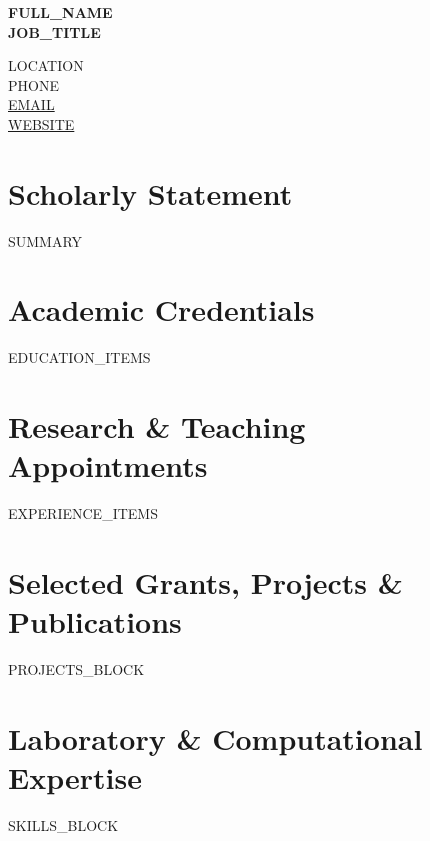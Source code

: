 \documentclass[10pt,letterpaper]{article}
\begin{document}
\begin{minipage}[t]{0.65\textwidth}
  {\LARGE \textbf{{{FULL_NAME}}}} \\[2pt]
  {\small \textbf{{{JOB_TITLE}}}}
\end{minipage}
\hfill
\begin{minipage}[t]{0.33\textwidth}
  \raggedleft \small
  {{LOCATION}} \\
  {{PHONE}} \\
  \href{mailto:{{EMAIL}}}{{{EMAIL}}} \\
  \href{https://{{WEBSITE}}}{{{WEBSITE}}}
\end{minipage}

\vspace{6pt}

\section{Scholarly Statement}
{{SUMMARY}}

\section{Academic Credentials}
{{EDUCATION_ITEMS}}

\section{Research \& Teaching Appointments}
{{EXPERIENCE_ITEMS}}

\section{Selected Grants, Projects \& Publications}
{{PROJECTS_BLOCK}}

\section{Laboratory \& Computational Expertise}
{{SKILLS_BLOCK}}
\end{document}

